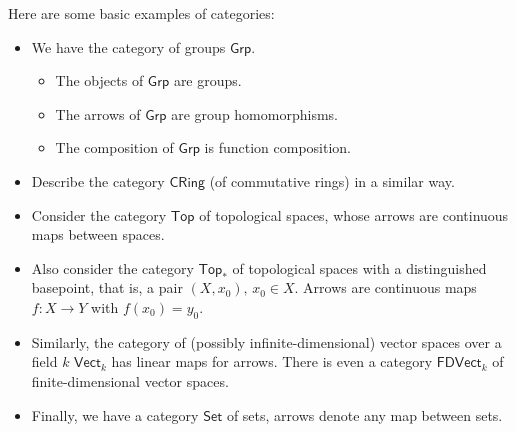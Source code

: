 \begin{example}
    Here are some basic examples of categories:
    \begin{itemize}
        \item We have the category of groups $\mathsf{Grp}.$ 
            \begin{itemize}
                \item The objects of $\mathsf{Grp}$ are groups.
                \item The arrows of $\mathsf{Grp}$ are group homomorphisms.
                \item The composition of $\mathsf{Grp}$ is function composition.
            \end{itemize}
        \item Describe the category $\mathsf{CRing}$ (of commutative rings) in a similar way.
        \item Consider the category $\mathsf{Top}$ of topological spaces, whose arrows are continuous maps between spaces.
        \item Also consider the category $\mathsf{Top}_{*}$ of topological spaces with a distinguished basepoint, that is, a pair $(X,x_0), \, x_0\in X$. Arrows are continuous maps $f \colon X \to Y$ with $f(x_0)=y_0$.
        \item Similarly, the category of (possibly infinite-dimensional) vector spaces over a field $k$ $\mathsf{Vect}_{k}$ has linear maps for arrows. There is even a category $\mathsf{FDVect}_{k}$ of finite-dimensional vector spaces.
        \item Finally, we have a category $\mathsf{Set}$ of sets, arrows denote any map between sets.
    \end{itemize}
\end{example}
